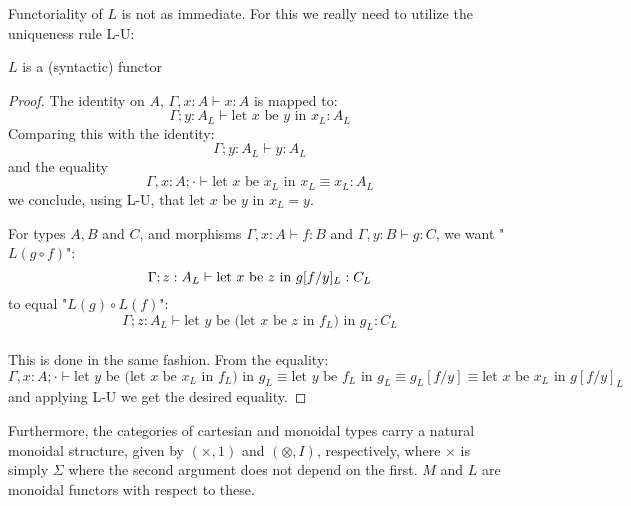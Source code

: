 Functoriality of $L$ is not as immediate. For this we really need to utilize the uniqueness rule L-U:
\begin{thm}
  $L$ is a (syntactic) functor
  \begin{proof}
The identity on $A$, $\Gamma, x : A \vdash x : A$ is mapped to:
\[
  \Gamma; y : A_L \vdash \text{let $x$ be $y$ in $x_L$} : A_L
\]
Comparing this with the identity:
\[
  \Gamma; y : A_L \vdash y : A_L
\]
and the equality
\[
  \Gamma, x : A; \cdot \vdash \text{let $x$ be $x_L$ in $x_L$} \equiv x_L : A_L
\]
we conclude, using L-U, that $\text{let $x$ be $y$ in $x_L$} = y$.

For types $A, B$ and $C$, and morphisms $\Gamma, x : A \vdash f : B$ and $\Gamma, y : B \vdash g : C$, we want "$L(g \circ f)$":
\[
  \Gamma; z : A_L \vdash \text{let $x$ be $z$ in $g[f/y]_L$} : C_L\\
\]
to equal "$L(g) \circ L(f)$":
\[
  \Gamma; z : A_L \vdash \text{let $y$ be (let $x$ be $z$ in $f_L$) in $g_L$} : C_L
\]\\
This is done in the same fashion. From the equality:
\[
  \Gamma, x : A; \cdot \vdash \text{let $y$ be (let $x$ be $x_L$ in $f_L$) in $g_L$} \equiv \text{let $y$ be $f_L$ in $g_L$} \equiv g_L[f/y] \equiv \text{let $x$ be $x_L$ in $g[f/y]_L$}
\]
and applying L-U we get the desired equality.
\end{proof}
\end{thm}
Furthermore, the categories of cartesian and monoidal types carry a natural monoidal structure, given by $(\times, 1)$ and $(\otimes, I)$, respectively, where $\times$ is simply $\Sigma$ where the second argument does not depend on the first. $M$ and $L$ are monoidal functors with respect to these.\\
